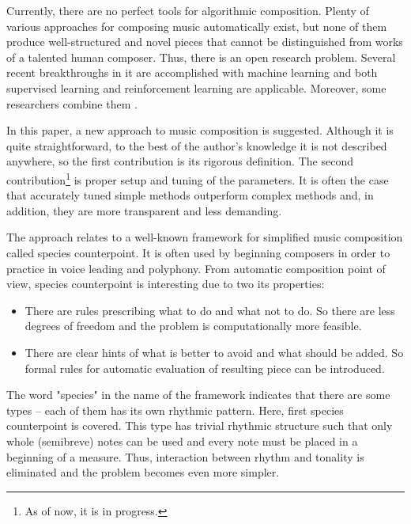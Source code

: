 \documentclass{article}
\begin{document}
Currently, there are no perfect tools for algorithmic composition. Plenty of various approaches for composing music automatically exist, but none of them produce well-structured and novel pieces that cannot be distinguished from works of a talented human composer. Thus, there is an open research problem. Several recent breakthroughs in it are accomplished with machine learning and both supervised learning \cite{johnson2017generating, payne2019musenet} and reinforcement learning \cite{smith2012reinforcement} are applicable. Moreover, some researchers combine them \cite{jaques2016generating, kotecha2018bach, kumar2019polyphonic}.

In this paper, a new approach to music composition is suggested. Although it is quite straightforward, to the best of the author's knowledge it is not described anywhere, so the first contribution is its rigorous definition. The second contribution\footnote{As of now, it is in progress.} is proper setup and tuning of the parameters. It is often the case that accurately tuned simple methods outperform complex methods \cite{dacrema2019are} and, in addition, they are more transparent and less demanding.

The approach relates to a well-known framework for simplified music composition called species counterpoint. It is often used by beginning composers in order to practice in voice leading and polyphony. From automatic composition point of view, species counterpoint is interesting due to two its properties:
\begin{itemize}
	\item There are rules prescribing what to do and what not to do. So there are less degrees of freedom and the problem is computationally more feasible.
	\item There are clear hints of what is better to avoid and what should be added. So formal rules for automatic evaluation of resulting piece can be introduced.
\end{itemize}

The word "species" in the name of the framework indicates that there are some types -- each of them has its own rhythmic pattern. Here, first species counterpoint is covered. This type has trivial rhythmic structure such that only whole (semibreve) notes can be used and every note must be placed in a beginning of a measure. Thus, interaction between rhythm and tonality is eliminated and the problem becomes even more simpler. 
\end{document}
